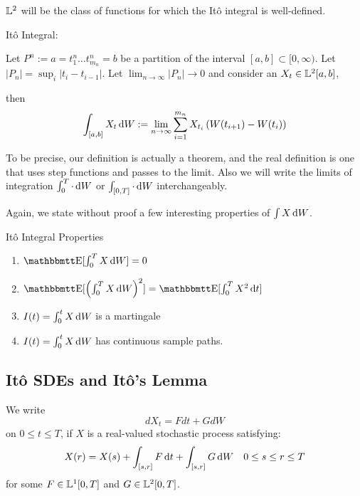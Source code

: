 ${\mathbb{L}^2}$ will be the class of functions for which the It\^o integral is
well-defined. 
\begin{defn} It\^o Integral:
\label{defn:ito_integral}

Let $P^n := {a = t^n_1 \ldots t^n_{m_n} = b}$ be a partition of the interval
$[a,b] \subset [0, \infty)$. Let $|P_n| = \sup_i|t_i - t_{i-1}|$. 
Let $ \lim_{n \rightarrow \infty} |P_n| \rightarrow 0 $ and consider an $ X_t
\in {\mathbb{L}^2}[a,b]$,

then
\begin{equation}
\int_{[a,b]} X_t \, \mathrm{d} W := \lim_{n \rightarrow \infty}  
\sum_{i=1}^{m_n} X_{t_i}\left( W(t_{i+1}) - W(t_{i})\right)
\end{equation}

\end{defn}

To be precise, our definition is actually a theorem, and the real
definition is one that uses step functions and passes to the limit.  Also we
will write the limits of integration $\int_0^T \cdot  \, \mathrm{d} W$ or $\int_{[0,T]}
\cdot  \, \mathrm{d} W$ interchangeably. 

Again, we state without proof a few interesting properties of $\int X \, \mathrm{d} W$.
\begin{thm} It\^o Integral Properties

\begin{enumerate}
  \item $\Exp[\int_0^T X \intd{W} ] = 0$ 
  \item $\Exp[\left(\int_0^T X \intd{W}\right)^2 ] = \Exp[\int_0^T X^2
  \intd{t}]$
  \item $I(t) = \int_0^t X \, \mathrm{d} W $ is a martingale 
  \item $I(t) = \int_0^t X \, \mathrm{d} W $ has continuous sample paths.
\end{enumerate}
\end{thm}

\subsection{It\^o SDEs and It\^o's Lemma}
\begin{defn}[It\^o SDE]

We write
\begin{equation}
dX_t = F dt + G dW
\end{equation}
on $0 \leq t \leq T$, if $X$ is a real-valued stochastic process satisfying:
\begin{equation*}
X(r) = X(s) + \int_{[s,r]} F \, \mathrm{d} t + \int_{[s,r]} G \, \mathrm{d} W
\quad 0\leq s \leq r \leq T
\end{equation*}
for some $F \in {\mathbb{L}^1}[0,T]$ and $G \in {\mathbb{L}^2}[0,T]$.
\end{defn}


